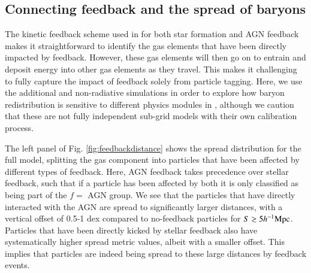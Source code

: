 \subsection{Connecting feedback and the spread of baryons}
\label{sec:fullmodelfeedback}

The kinetic feedback scheme used in \simba{} for both star formation and AGN
feedback makes it straightforward to identify the gas elements that have been
directly impacted by feedback. However, these gas elements will then go on to
entrain and deposit energy into other gas elements as they travel. This makes
it challenging to fully capture the impact of feedback solely from particle
tagging. Here, we use the additional \nojet{} and non-radiative simulations
in order to explore how baryon redistribution is sensitive to different
physics modules in \simba{}, although we caution that these are not fully
independent sub-grid models with their own calibration process.



The left panel of Fig. \ref{fig:feedbackdistance} shows the spread distribution
for the full \simba{} model, splitting the gas component into particles that
have been affected by different types of feedback. Here, AGN feedback takes
precedence over stellar feedback, such that if a particle has been affected
by both it is only classified as being part of the $f=$ AGN group. We see that
the particles that have directly interacted with the AGN are spread to
significantly larger distances, with a vertical offset of 0.5-1 dex compared
to no-feedback particles for $S \gtrsim 5h^{-1}{\rm Mpc}{}$. Particles that have been
directly kicked by stellar feedback also have systematically higher spread
metric values, albeit with a smaller offset. This implies that particles are
indeed being spread to these large distances by feedback events.

